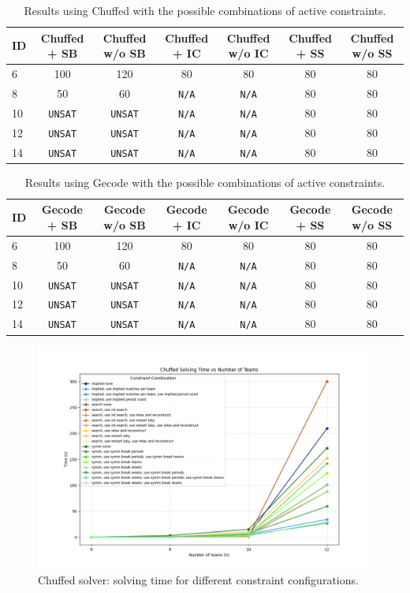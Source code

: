 \documentclass[11pt]{article}
\begin{document}
\begin{table}[H]
\label{tab:chuffed}
\small
\begin{tabular}{@{}lcccccc@{}}
\toprule
ID & Chuffed + SB & Chuffed w/o SB & Chuffed + IC & Chuffed w/o IC & Chuffed + SS & Chuffed w/o SS \\
\midrule
6 & 100 & 120 & 80 & 80 & 80 & 80\\
8 & 50 & 60 & \texttt{N/A} & \texttt{N/A} & 80 & 80 \\
10 & \texttt{UNSAT} & \texttt{UNSAT} & \texttt{N/A} & \texttt{N/A} & 80 & 80\\
12 & \texttt{UNSAT} & \texttt{UNSAT} & \texttt{N/A} & \texttt{N/A} & 80 & 80\\
14 & \texttt{UNSAT} & \texttt{UNSAT} & \texttt{N/A} & \texttt{N/A} & 80 & 80\\
\bottomrule
\end{tabular}
\caption{Results using Chuffed with the possible combinations of active constraints.}
\end{table}

\begin{table}[H]
\centering
\small
\label{tab:search}
\begin{tabular}{@{}lcccccc@{}}
\toprule
ID & Gecode + SB & Gecode w/o SB & Gecode + IC & Gecode w/o IC & Gecode + SS & Gecode w/o SS \\
\midrule
6 & 100 & 120 & 80 & 80 & 80 & 80\\
8 & 50 & 60 & \texttt{N/A} & \texttt{N/A} & 80 & 80 \\
10 & \texttt{UNSAT} & \texttt{UNSAT} & \texttt{N/A} & \texttt{N/A} & 80 & 80\\
12 & \texttt{UNSAT} & \texttt{UNSAT} & \texttt{N/A} & \texttt{N/A} & 80 & 80\\
14 & \texttt{UNSAT} & \texttt{UNSAT} & \texttt{N/A} & \texttt{N/A} & 80 & 80\\
\bottomrule
\end{tabular}
\caption{Results using Gecode with the possible combinations of active constraints.}
\end{table}

\begin{figure}[H]
    \centering
    \includegraphics[width=1\textwidth]{chuffed_plot.png}
    \caption{Chuffed solver: solving time for different constraint configurations.}
    \label{fig:chuffed_plot}
\end{figure}
\end{document}
